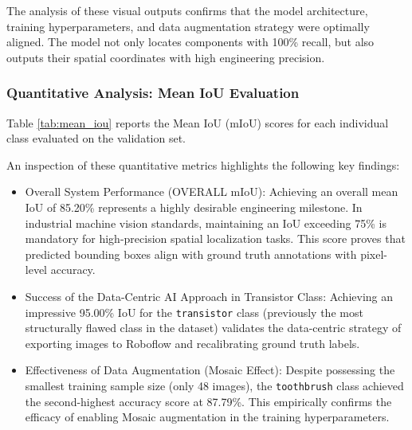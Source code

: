 \documentclass{article}
\begin{document}
The analysis of these visual outputs confirms that the model architecture, training hyperparameters, and data augmentation strategy were optimally aligned. The model not only locates components with 100\% recall, but also outputs their spatial coordinates with high engineering precision.


\subsubsection{Quantitative Analysis: Mean IoU Evaluation}


Table \ref{tab:mean_iou} reports the Mean IoU (mIoU) scores for each individual class evaluated on the validation set.

\begin{table}[htbp]
	\centering
	\caption{Summary of Mean IoU (mIoU) evaluation results by class on the validation dataset}
	\label{tab:mean_iou}
	\vspace{2mm}
\end{table}

An inspection of these quantitative metrics highlights the following key findings:

\begin{itemize}
	\item Overall System Performance (OVERALL mIoU): Achieving an overall mean IoU of 85.20\% represents a highly desirable engineering milestone. In industrial machine vision standards, maintaining an IoU exceeding 75\% is mandatory for high-precision spatial localization tasks. This score proves that predicted bounding boxes align with ground truth annotations with pixel-level accuracy.
	\item Success of the Data-Centric AI Approach in Transistor Class: Achieving an impressive 95.00\% IoU for the \texttt{transistor} class (previously the most structurally flawed class in the dataset) validates the data-centric strategy of exporting images to Roboflow and recalibrating ground truth labels.
	\item Effectiveness of Data Augmentation (Mosaic Effect): Despite possessing the smallest training sample size (only 48 images), the \texttt{toothbrush} class achieved the second-highest accuracy score at 87.79\%. This empirically confirms the efficacy of enabling Mosaic augmentation in the training hyperparameters.
\end{itemize}
\end{document}
